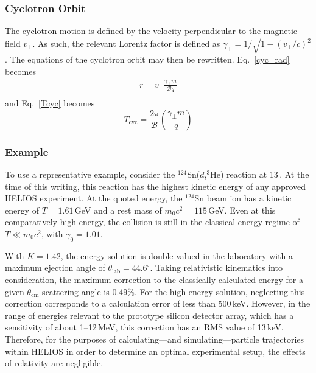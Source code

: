 \subsubsection{Cyclotron Orbit}
The cyclotron motion is defined by the velocity perpendicular to the magnetic field $v_\perp$.  As such, the relevant Lorentz factor is defined as $\gamma_\perp=1/\sqrt{1-(v_\perp/c)^2}$.  The equations of the cyclotron orbit may then be rewritten.
Eq.~\ref{cyc_rad} becomes
\begin{equation}
\begin{split}
r=v_{\perp}\frac{\gamma_\perp m}{\mathscr{B}q}\\
\end{split}
\label{rel_cyc_rad}
\end{equation}
and Eq.~\ref{Tcyc} becomes
\begin{equation}
T_\mathrm{cyc}=\frac{2\pi}{\mathscr{B}} \left(\frac{\gamma_\perp m}{q}\right)
\label{rel_Tcyc}
\end{equation}
\subsubsection{Example}
To use a representative example, consider the $^{124}$Sn($d$,$^3$He) reaction at 13\,\AMeV.  At the time of this writing, this reaction has the highest kinetic energy of any approved HELIOS experiment.  At the quoted energy, the $^{124}$Sn beam ion has a kinetic energy of $T=1.61$\,GeV and a rest mass of $m_0 c^2=115$\,GeV.  Even at this comparatively high energy, the collision is still in the classical energy regime of $T\ll m_0 c^2$, with $\gamma_0=1.01$.

With $K=1.42$, the energy solution is double-valued in the laboratory with a maximum ejection angle of $\theta_\mathrm{lab}=44.6^\circ$.  Taking relativistic kinematics into consideration, the maximum correction to the classically-calculated energy for a given $\theta_\mathrm{cm}$ scattering angle is 0.49\%.  For the high-energy solution, neglecting this correction corresponds to a calculation error of less than 500\,keV.  However, in the range of energies relevant to the prototype silicon detector array, which has a sensitivity of about 1--12\,MeV, this correction has an RMS value of 13\,keV\label{typo5}.  Therefore, for the purposes of calculating---and simulating---particle trajectories within HELIOS in order to determine an optimal experimental setup, the effects of relativity are negligible. 


